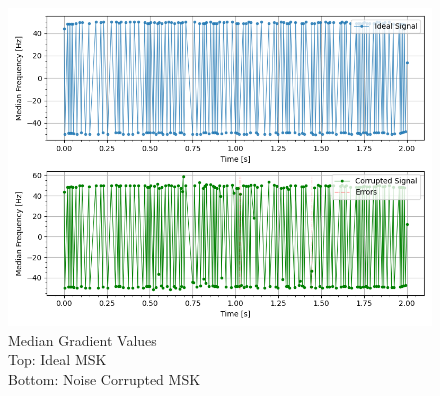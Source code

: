 \begin{figure}[h!]
    \centering
    \includegraphics[width = \textwidth]{figs/error/medianGrad.png}
    \caption{\centering Median Gradient Values \\ Top: Ideal MSK \\ Bottom: Noise Corrupted MSK}
    \label{fig:medgrad}
\end{figure}

